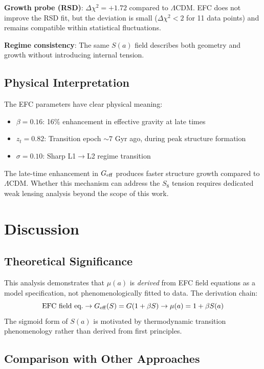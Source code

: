 \documentclass[12pt,a4paper]{article}
\begin{document}
\textbf{Growth probe (RSD)}: $\Delta\chi^2 = +1.72$ compared to $\Lambda$CDM. EFC does 
not improve the RSD fit, but the deviation is small ($\Delta\chi^2 < 2$ for 11 data points) 
and remains compatible within statistical fluctuations.

\textbf{Regime consistency}: The same $S(a)$ field describes both geometry and growth 
without introducing internal tension.

\subsection{Physical Interpretation}

The EFC parameters have clear physical meaning:
\begin{itemize}
\item $\beta = 0.16$: 16\% enhancement in effective gravity at late times
\item $z_t = 0.82$: Transition epoch $\sim 7$ Gyr ago, during peak structure formation
\item $\sigma = 0.10$: Sharp L1$\to$L2 regime transition
\end{itemize}

The late-time enhancement in $G_{\rm eff}$ produces faster structure growth compared 
to $\Lambda$CDM. Whether this mechanism can address the $S_8$ tension requires 
dedicated weak lensing analysis beyond the scope of this work.

\section{Discussion}

\subsection{Theoretical Significance}

This analysis demonstrates that $\mu(a)$ is \emph{derived} from EFC field equations 
as a model specification, not phenomenologically fitted to data. The derivation chain:
\begin{equation}
\text{EFC field eq.} \to G_{\rm eff}(S) = G(1 + \beta S) \to \mu(a) = 1 + \beta S(a)
\end{equation}
The sigmoid form of $S(a)$ is motivated by thermodynamic transition phenomenology 
rather than derived from first principles.

\subsection{Comparison with Other Approaches}
\end{document}
